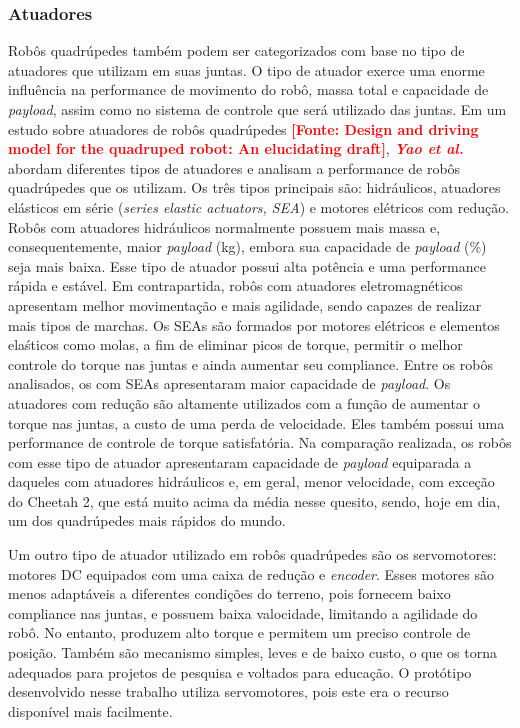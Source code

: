 \documentclass[../main.tex]{subfiles}
\begin{document}
  \subsubsection{Atuadores}
  Robôs quadrúpedes também podem ser categorizados com base no tipo de atuadores que utilizam em suas juntas. O tipo de atuador exerce uma enorme influência na performance de movimento do robô, massa total e capacidade de \textit{payload}, assim como no sistema de controle que será utilizado das juntas. Em um estudo sobre atuadores de robôs quadrúpedes \textbf{\textcolor{red}{[Fonte: Design and driving model for the quadruped robot: An elucidating draft]}}, \textbf{\textcolor{red}{\textit{Yao et al.}}} abordam diferentes tipos de atuadores e analisam a performance de robôs quadrúpedes que os utilizam. Os três tipos principais são: hidráulicos, atuadores elásticos em série (\textit{series elastic actuators, SEA}) e motores elétricos com redução. Robôs com atuadores hidráulicos normalmente possuem mais massa e, consequentemente, maior \textit{payload} (kg), embora sua capacidade de \textit{payload} (\%) seja mais baixa. Esse tipo de atuador possui alta potência e uma performance rápida e estável. Em contrapartida, robôs com atuadores eletromagnéticos apresentam melhor movimentação e mais agilidade, sendo capazes de realizar mais tipos de marchas. Os SEAs são formados por motores elétricos e elementos elaśticos como molas, a fim de eliminar picos de torque, permitir o melhor controle do torque nas juntas e ainda aumentar seu compliance. Entre os robôs analisados, os com SEAs apresentaram maior capacidade de \textit{payload}. Os atuadores com redução são altamente utilizados com a função de aumentar o torque nas juntas, a custo de uma perda de velocidade. Eles também possui uma performance de controle de torque satisfatória. Na comparação realizada, os robôs com esse tipo de atuador apresentaram capacidade de \textit{payload} equiparada a daqueles com atuadores hidráulicos e, em geral, menor velocidade, com exceção do Cheetah 2, que está muito acima da média nesse quesito, sendo, hoje em dia, um dos quadrúpedes mais rápidos do mundo.

  Um outro tipo de atuador utilizado em robôs quadrúpedes são os servomotores: motores DC equipados com uma caixa de redução e \textit{encoder}. Esses motores são menos adaptáveis a diferentes condições do terreno, pois fornecem baixo compliance nas juntas, e possuem baixa valocidade, limitando a agilidade do robô. No entanto, produzem alto torque e permitem um preciso controle de posição. Também são mecanismo simples, leves e de baixo custo, o que os torna adequados para projetos de pesquisa e voltados para educação. O protótipo desenvolvido nesse trabalho utiliza servomotores, pois este era o recurso disponível mais facilmente.
\end{document}
